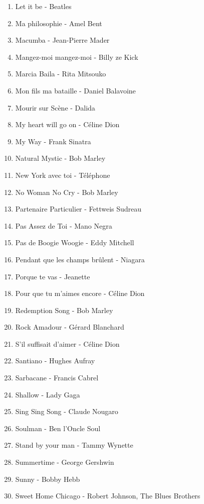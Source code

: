 \documentclass[12pt]{extarticle}
\begin{document}
\begin{multicols}{2}
\begin{enumerate}[nolistsep]
\item   Let it be
        - Beatles
\item   Ma philosophie
        - Amel Bent
\item   Macumba
        - Jean-Pierre Mader
\item   Mangez-moi mangez-moi
        - Billy ze Kick
\item   Marcia Baila
        - Rita Mitsouko
\item   Mon fils ma bataille
        - Daniel Balavoine
\item   Mourir sur Scène
        - Dalida
\item   My heart will go on
        - Céline Dion
\item   My Way
        - Frank Sinatra
\item   Natural Mystic
        - Bob Marley
\item   New York avec toi
        - Téléphone
\item   No Woman No Cry
        - Bob Marley
\item   Partenaire Particulier
        - Fettweis Sudreau
\item   Pas Assez de Toi
        - Mano Negra
\item   Pas de Boogie Woogie
        - Eddy Mitchell
\item   Pendant que les champs brûlent
        - Niagara
\item   Porque te vas
        - Jeanette
\item   Pour que tu m'aimes encore
        - Céline Dion
\item   Redemption Song
        - Bob Marley
\item   Rock Amadour
        - Gérard Blanchard
\item   S'il suffisait d'aimer
        - Céline Dion
\item   Santiano
        - Hughes Aufray
\item   Sarbacane
        - Francis Cabrel
\item   Shallow
        - Lady Gaga
\item   Sing Sing Song
        - Claude Nougaro
\item   Soulman
        - Ben l'Oncle Soul
\item   Stand by your man
        - Tammy Wynette
\item   Summertime
        - George Gershwin
\item   Sunny
        - Bobby Hebb
\item   Sweet Home Chicago
        - Robert Johnson, The Blues Brothers

\end{enumerate}
\end{multicols}
\end{document}
